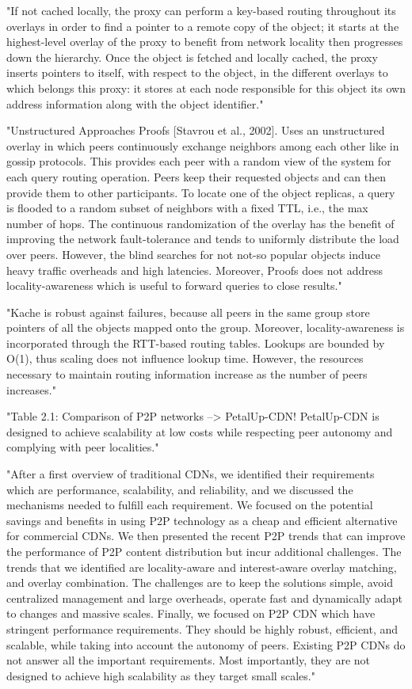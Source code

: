 "If not cached locally, the proxy can perform a key-based routing throughout its overlays in order to find a pointer to a remote copy of the object; it starts at the highest-level overlay of the proxy to benefit from network locality then progresses down the hierarchy.
Once the object is fetched and locally cached, the proxy inserts pointers to itself, with respect to the object, in the different overlays to which belongs this proxy: it stores at each node responsible for this object its own address information along with the object identifier."\cite{book:p2p-mob}

"Unstructured Approaches
Proofs [Stavrou et al., 2002]. Uses an unstructured overlay in which peers continuously exchange neighbors among each other like in gossip protocols.
This provides each peer with a random view of the system for each query routing operation.
Peers keep their requested objects and can then provide them to other participants.
To locate one of the object replicas, a query is flooded to a random subset of neighbors with a fixed TTL, i.e., the max number of hops.
The continuous randomization of the overlay has the benefit of improving the network fault-tolerance and tends to uniformly distribute the load over peers.
However, the blind searches for not not-so popular objects induce heavy traffic overheads and high latencies.
Moreover, Proofs does not address locality-awareness which is useful to forward queries to close results."\cite{book:p2p-mob}

"Kache is robust against failures, because all peers in the same group store pointers of all the objects mapped onto the group. Moreover, locality-awareness is incorporated through the RTT-based routing tables.
Lookups are bounded by O(1), thus scaling does not influence lookup time.
However, the resources necessary to maintain routing information increase as the number of peers increases."\cite{book:p2p-mob}

"Table 2.1: Comparison of P2P networks --> PetalUp-CDN!
PetalUp-CDN is designed to achieve scalability at low costs while respecting peer autonomy and complying with peer localities."\cite{book:p2p-mob}

"After a first overview of traditional CDNs, we identified their requirements which are performance, scalability, and reliability, and we discussed the mechanisms needed to fulfill each requirement.
We focused on the potential savings and benefits in using P2P technology as a cheap and efficient alternative for commercial CDNs.
We then presented the recent P2P trends that can improve the performance of P2P content distribution but incur additional challenges.
The trends that we identified are locality-aware and interest-aware overlay matching, and overlay combination.
The challenges are to keep the solutions simple, avoid centralized management and large overheads, operate fast and dynamically adapt to changes and massive scales.
Finally, we focused on P2P CDN which have stringent performance requirements.
They should be highly robust, efficient, and scalable, while taking into account the autonomy of peers.
Existing P2P CDNs do not answer all the important requirements.
Most importantly, they are not designed to achieve high scalability as they target small scales."\cite{book:p2p-mob}


